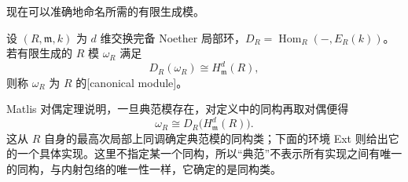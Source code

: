 现在可以准确地命名所需的有限生成模。

\begin{definition}\label{b3:def:canonical-module-regular-quotient}
	设 \((R,\mathfrak m,k)\) 为 \(d\) 维交换完备 Noether 局部环，\(D_R=\operatorname{Hom}_R(-,E_R(k))\)。若有限生成的 \(R\) 模 \(\omega_R\) 满足
	\[
		D_R(\omega_R)\cong H^d_{\mathfrak m}(R),
	\]
	则称 \(\omega_R\) 为 \(R\) 的[canonical module]。
\end{definition}

Matlis 对偶定理说明，一旦典范模存在，对定义中的同构再取对偶便得
\[
	\omega_R\cong D_R\bigl(H^d_{\mathfrak m}(R)\bigr).
\]
这从 \(R\) 自身的最高次局部上同调确定典范模的同构类；下面的环境 Ext 则给出它的一个具体实现。这里不指定某一个同构，所以“典范”不表示所有实现之间有唯一的同构，与内射包络的唯一性一样，它确定的是同构类。

